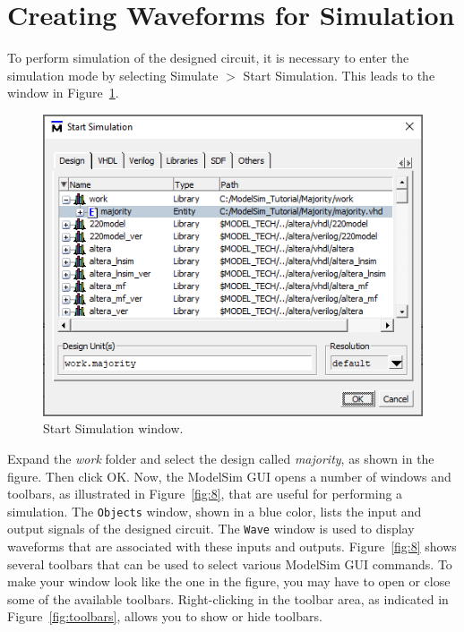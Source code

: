 \documentclass[11pt, twoside, pdftex]{article}
\begin{document}
\section{Creating Waveforms for Simulation}

To perform simulation of the designed circuit, it is necessary to enter the simulation mode
by selecting {\sf Simulate $>$ Start Simulation}. This leads to the window in Figure~\ref{fig:7}.

\begin{figure}[H]
   \begin{center}
      \includegraphics[scale=1.5]{figures/figure7.png}
   \caption{Start Simulation window.} 
	 \label{fig:7}
	 \end{center}
\end{figure}

Expand the {\it work} folder and select the design called {\it majority}, as shown in the
figure. Then click {\sf OK}. Now, the ModelSim GUI opens a number of windows and toolbars, 
as illustrated in Figure~\ref{fig:8}, that are useful for performing a simulation.  
The \texttt{Objects} window, shown in a blue color, lists the input and output signals 
of the designed circuit. The \texttt{Wave} window is used to display waveforms that are
associated with these inputs and outputs. Figure~\ref{fig:8} shows several toolbars 
that can be used to select various ModelSim GUI commands. To make your window look like 
the one in the figure, you may have to open or close some of the available toolbars. 
{\sf Right-clicking} in the toolbar area, as indicated in Figure~\ref{fig:toolbars}, 
allows you to show or hide toolbars.
\end{document}
